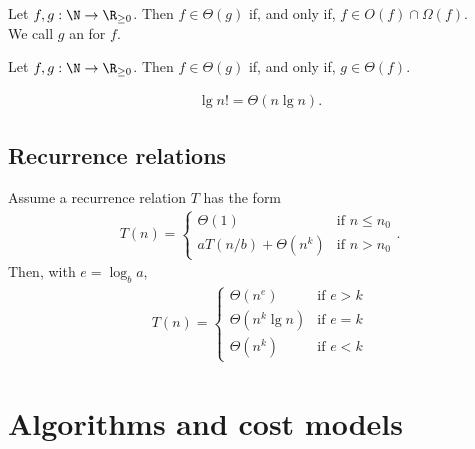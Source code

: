 \documentclass{article}
\begin{document}
\begin{definition}
	Let $f,g:\N\to\R_{\geq 0}$. Then $f\in\Theta(g)$ if, and only if, $f\in O(f) \cap \Omega(f)$.\\
	We call $g$ an  for $f$.
\end{definition}
\begin{theorem}
	Let $f,g:\N\to\R_{\geq 0}$. Then $f\in\Theta(g)$ if, and only if, $g\in\Theta(f)$.
\end{theorem}
\begin{theorem}
	\begin{align*}
		\lg n! = \Theta(n \lg n).
	\end{align*}
\end{theorem}


\subsection{Recurrence relations}


\begin{theorem}
	Assume a recurrence relation $T$ has the form
	\begin{align*}
		T(n) = \begin{cases}
			\Theta(1) &\text{if $n\leq n_0$}\\
			aT(n/b) + \Theta(n^k) &\text{if $n>n_0$}
		\end{cases}.
	\end{align*}
	Then, with $e=\log_b a$, 
	\begin{align*}
		T(n) = \begin{cases}
			\Theta(n^e) &\text{if $e>k$}\\
			\Theta(n^k\lg n) &\text{if $e=k$}\\
			\Theta(n^k) &\text{if $e<k$}
		\end{cases}
	\end{align*}
\end{theorem}



\section{Algorithms and cost models}
\end{document}
